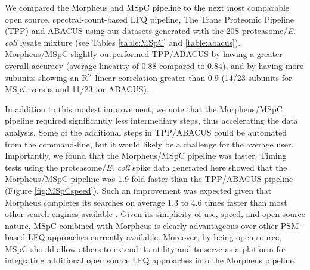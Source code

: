 We compared the Morpheus and MSpC pipeline to the next most comparable open source, spectral-count-based LFQ pipeline, The Trans Proteomic Pipeline (TPP) \citep{deutsch10} and ABACUS \citep{fermin11} using our datasets generated with the 20S proteasome/\textit{E. coli} lysate mixture (see Tables \ref{table:MSpC} and \ref{table:abacus}).
Morpheus/MSpC slightly outperformed TPP/ABACUS by having a greater overall accuracy (average linearity of 0.88 compared to 0.84), and by having more subunits showing an R$\textsuperscript{2}$ linear correlation greater than 0.9 (14/23 subunits for MSpC versus and 11/23 for ABACUS).
\begin{table}[h]
	\centering
\begingroup
\let\clearpage\relax
\scalebox{0.7}{

}
\endgroup
\npnoround
\label{table:MSpC}
\end{table}
\begin{table}[h]
	\centering
\begingroup
\let\clearpage\relax
\scalebox{0.7}{

}
\endgroup
\npnoround
\label{table:abacus}
\end{table}

In addition to this modest improvement, we note that the Morpheus/MSpC pipeline required significantly less intermediary steps, thus accelerating the data analysis.
Some of the additional steps in TPP/ABACUS could be automated from the command-line, but it would likely be a challenge for the average user.
Importantly, we found that the Morpheus/MSpC pipeline was faster.
Timing tests using the proteasome/\textit{E. coli} spike data generated here showed that the Morpheus/MSpC pipeline was 1.9-fold faster than the TPP/ABACUS pipeline (Figure \ref{fig:MSpCspeed}).
Such an improvement was expected given that Morpheus completes its searches on average 1.3 to 4.6 times faster than most other search engines available \citep{wenger13}. 
Given its simplicity of use, speed, and open source nature, MSpC combined with Morpheus is clearly advantageous over other PSM-based LFQ approaches currently available.  Moreover, by being open source, MSpC should allow others to extend its utility and to serve as a platform for integrating additional open source LFQ approaches into the Morpheus pipeline. 

